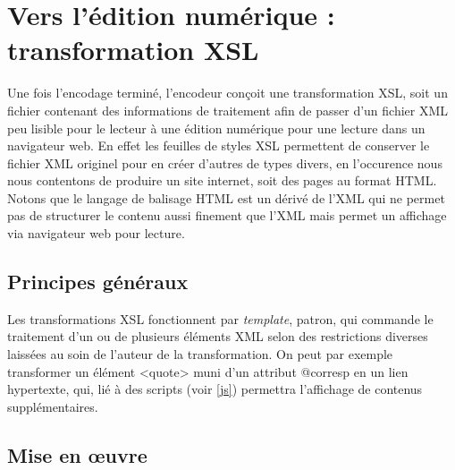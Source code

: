 \section{Vers l'édition numérique : transformation XSL}
\label{ref:xsl_gen}
Une fois l'encodage terminé, l'encodeur conçoit une transformation XSL, soit un fichier contenant des informations de traitement afin de passer d'un fichier XML peu lisible pour le lecteur à une édition numérique pour une lecture dans un navigateur web. En effet les feuilles de styles XSL permettent de conserver le fichier XML originel pour en créer d'autres de types divers, en l'occurence nous nous contentons de produire un site internet, soit des pages au format HTML. Notons que le langage de balisage HTML est un dérivé de l'XML qui ne permet pas de structurer le contenu aussi finement que l'XML mais permet un affichage via navigateur web pour lecture.
    \subsection{Principes généraux}
Les transformations XSL fonctionnent par \textit{template}, patron, qui commande le traitement d'un ou de plusieurs éléments XML selon des restrictions diverses laissées au soin de l'auteur de la transformation. On peut par exemple transformer un élément <quote> muni d'un attribut @corresp en un lien hypertexte, qui, lié à des scripts (voir \ref{js}) permettra l'affichage de contenus supplémentaires. 
    \subsection{Mise en œuvre}


